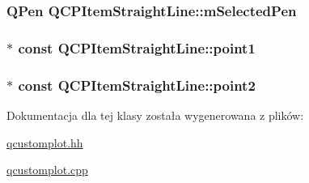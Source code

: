 \subsubsection[{\texorpdfstring{m\+Selected\+Pen}{mSelectedPen}}]{\setlength{\rightskip}{0pt plus 5cm}Q\+Pen Q\+C\+P\+Item\+Straight\+Line\+::m\+Selected\+Pen\hspace{0.3cm}{\ttfamily [protected]}}\hypertarget{class_q_c_p_item_straight_line_a0307a0d56a018656adbf798bc84c2a4b}{}\label{class_q_c_p_item_straight_line_a0307a0d56a018656adbf798bc84c2a4b}
\subsubsection[{\texorpdfstring{point1}{point1}}]{$\ast$ const Q\+C\+P\+Item\+Straight\+Line\+::point1}\hypertarget{class_q_c_p_item_straight_line_ac131a6ffe456f2cc7364dce541fe0120}{}\label{class_q_c_p_item_straight_line_ac131a6ffe456f2cc7364dce541fe0120}
\subsubsection[{\texorpdfstring{point2}{point2}}]{$\ast$ const Q\+C\+P\+Item\+Straight\+Line\+::point2}\hypertarget{class_q_c_p_item_straight_line_ad26c0a732e471f63f75d481dcd48cfc9}{}\label{class_q_c_p_item_straight_line_ad26c0a732e471f63f75d481dcd48cfc9}


Dokumentacja dla tej klasy została wygenerowana z plików\+:\begin{DoxyCompactItemize}
\item 
\hyperlink{qcustomplot_8hh}{qcustomplot.\+hh}\item 
\hyperlink{qcustomplot_8cpp}{qcustomplot.\+cpp}\end{DoxyCompactItemize}
